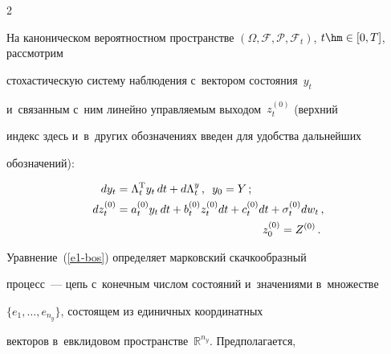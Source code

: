 \begin{multicols}{2}
\vspace*{-2pt}





     На каноническом вероятностном пространстве $(\Omega, 


\mathcal{F},\mathcal{P}, \mathcal{F}_t)$, $t\hm\in [0,T]$, рассмотрим 


стохастическую систему наблюдения с~вектором состояния~$y_t$ 


и~связанным с~ним линейно управляемым выходом~$z_t^{(0)}$ (верхний 


индекс здесь и~в~других обозначениях введен для удобства дальнейших 


обозначений):





\vspace*{-2pt}





\noindent


     \begin{align}


     dy_t&= \Lambda_t^{\mathrm{T}} y_t\, dt+d\Lambda_t^y\,,\enskip y_0=Y\,;  


\label{e1-bos} \\


     dz_t^{(0)} &= a_t^{(0)} y_t\,dt+b_t^{(0)} z_t^{(0)}dt+c_t^{(0)}dt 


+\sigma_t^{(0)}dw_t\,,\notag\\


&\hspace*{46mm}z_0^{(0)}=Z^{(0)}\,.


     \label{e2-bos}


     \end{align}


     


     \vspace*{-2pt}


     


     Уравнение~(\ref{e1-bos}) определяет марковский скачкообразный 


процесс~--- цепь с~конечным числом состояний и~значениями в~множестве 


     $\{ e_1, \ldots , e_{n_y}\}$, состоящем из единичных координатных 


векторов в~евклидовом пространстве~$\mathbb{R}^{n_y}$. Предполагается, 



\end{multicols}

